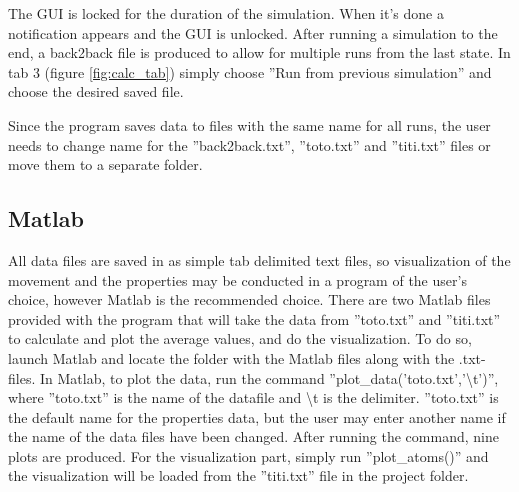 The GUI is locked for the duration of the simulation. When it's done a notification appears and the GUI is unlocked. After running a simulation to the end, a back2back file is produced to allow for multiple runs from the last state. In tab 3 (figure \ref{fig:calc_tab}) simply choose ''Run from previous simulation'' and choose the desired saved file.

Since the program saves data to files with the same name for all runs, the user needs to change name for the ''back2back.txt'', ''toto.txt'' and ''titi.txt'' files or move them to a separate folder.

\subsection{Matlab}
All data files are saved in as simple tab delimited text files, so visualization of the movement and the properties may be conducted in a program of the user's choice, however Matlab is the recommended choice. There are two Matlab files provided with the program that will take the data from ''toto.txt'' and ''titi.txt'' to calculate and plot the average values, and do the visualization. To do so, launch Matlab and locate the folder with the Matlab files along with the .txt-files. In Matlab, to plot the data, run the command ''plot\_data('toto.txt','\textbackslash{}t')'', where ''toto.txt'' is the name of the datafile and \textbackslash{}t is the delimiter. ''toto.txt'' is the default name for the properties data, but the user may enter another name if the name of the data files have been changed. After running the command, nine plots are produced. For the visualization part, simply run ''plot\_atoms()'' and the visualization will be loaded from the ''titi.txt'' file in the project folder.
